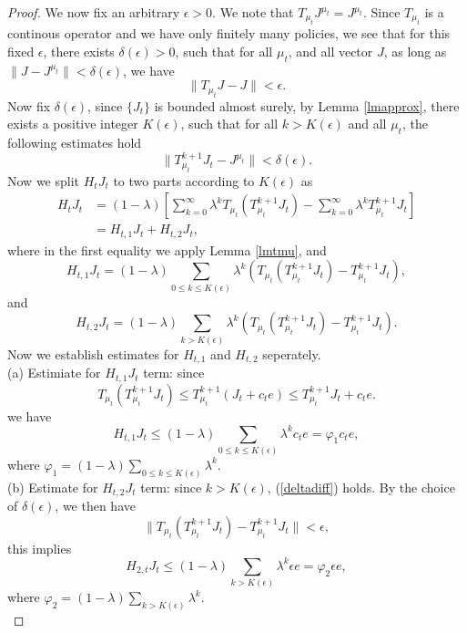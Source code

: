 \documentclass[12pt,a4paper]{amsart}
\numberwithin{equation}{section}
\theoremstyle{plain}
\theoremstyle{definition}
\begin{document}
\begin{proof}
	We now fix an arbitrary $\epsilon > 0$. We note that $T_{\mu_t} J^{\mu_t}  = J^{\mu_t}$. Since $T_{\mu_t}$ is a continous operator and we have only finitely many policies, we see that for this fixed $\epsilon$, there exists $\delta(\epsilon) > 0$, such that for all $\mu_t$, and all vector $J$,  as long as $\|J - J^{\mu_t}\| < \delta(\epsilon)$, we have
	$$
	\| T_{\mu_t} J - J \| < \epsilon. 
	$$ 
	Now fix $\delta(\epsilon)$, since $\{J_t\}$ is bounded almost surely, by Lemma \ref{lmapprox},  there exists a positive integer $K(\epsilon)$, such that for all $k > K(\epsilon)$ and all $\mu_t$, the following estimates hold
	\begin{equation} \label{deltadiff}
	\| T_{\mu_t}^{k+1} J_t - J^{\mu_t}\| < \delta(\epsilon).
	\end{equation}
	Now we split $H_t J_t$ to two parts according to $K(\epsilon)$ as
	\begin{equation}\label{h1h2}
	\begin{aligned}
	H_t J_t & = (1-\lambda) \left[\sum_{k=0}^{\infty} \lambda^k T_{\mu_t} \left( T_{\mu_t}^{k+1} J_t \right)-  \sum_{k=0}^{\infty} \lambda^k T_{\mu_t}^{k+1} J_t \right]  \\
	& = H_{t, 1} J_t+ H_{t, 2} J_t,
	\end{aligned}
	\end{equation}
	where in the first equality we apply Lemma \ref{lmtmu}, and 
	$$
	H_{t, 1} J_t = (1-\lambda) \sum_{0 \le k\le K(\epsilon)} \lambda^k \left( T_{\mu_t} (T_{\mu_t}^{k+1} J_t) - T_{\mu_t}^{k+1}J_t \right), 
	$$
	and 
	$$
	H_{t, 2} J_t =  (1-\lambda) \sum_{k> K(\epsilon)} \lambda^k \left( T_{\mu_t} (T_{\mu_t}^{k+1} J_t) - T_{\mu_t}^{k+1}J_t \right). 
	$$
	Now we establish estimates for $H_{t,1}$ and $H_{t,2}$ seperately. \\
	
	(a) Estimiate for $H_{t,1}J_t$ term: since
	$$
	T_{\mu_t} \left(T_{\mu_t}^{k+1}J_t\right) \le T_{\mu_t}^{k+1} (J_t + c_t e) \le T_{\mu_t}^{k+1} J_t + c_t e. 
	$$
	we have
	\begin{equation} \label{ht1}
	H_{t,1} J_t \le (1-\lambda) \sum_{0 \le k \le K(\epsilon)} \lambda^k c_t e = \varphi_1 c_t e, 
	\end{equation}
	where $\varphi_1 = (1-\lambda) \sum_{0 \le k \le K(\epsilon)} \lambda^k$.  \\
	
	(b) Estimate for $H_{t,2}J_t$ term: since $k > K(\epsilon)$, (\ref{deltadiff}) holds. By the choice of $\delta(\epsilon)$, we then have
	$$
	\|T_{\mu_t} (T_{\mu_t}^{k+1} J_t) - T_{\mu_t}^{k+1}J_t\| < \epsilon, 
	$$
	this implies
	\begin{equation}  \label{ht2}
		H_{2, t}J_t \le (1-\lambda) \sum_{k > K(\epsilon)} \lambda^k \epsilon e = \varphi_2 \epsilon e,
	\end{equation}
	where $\varphi_2 = (1-\lambda) \sum_{k > K(\epsilon)} \lambda^k $.  \\
	

\end{proof}
\end{document}
